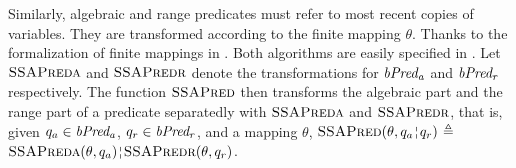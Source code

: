 Similarly, algebraic and range predicates must refer to most recent copies of
variables. They are transformed according to the finite mapping
$\theta$. Thanks to the formalization of finite mappings in \coq. Both
algorithms are easily specified in \gallina.
Let $\textsc{SSAPreda}$ and $\textsc{SSAPredr}$ denote the transformations for $\mathit{bPred_a}$ and $\mathit{bPred_r}$ respectively.
The function $\textsc{SSAPred}$ then transforms the algebraic part and the range part of a predicate separatedly with $\textsc{SSAPreda}$ and $\textsc{SSAPredr}$, that is, given $q_a \in \mathit{bPred_a}$, $q_r \in \mathit{bPred_r}$, and a mapping $\theta$, $\textsc{SSAPred}(\theta, q_a \andar q_r)$ $\triangleq$ $\textsc{SSAPreda}(\theta, q_a) \andar \textsc{SSAPredr}(\theta, q_r)$.



